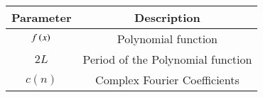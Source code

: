 \begin{tabular}[12pt]{ |c| c|}
    \hline
    \textbf{Parameter} & \textbf{Description}\\ 
    \hline
    $f\left(x\right)$ & Polynomial function\\
    \hline
    $2L$& Period of the Polynomial function\\ 
    \hline
    $c(n)$ & Complex Fourier Coefficients\\
    \hline
     \end{tabular}

